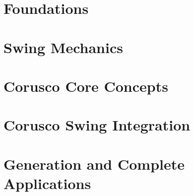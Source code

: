 \documentclass[10pt,a5paper,twoside,openright]{book}
\begin{document}
\frontmatter


\tableofcontents
\mainmatter
\part{Foundations}






\part{Swing Mechanics}














\part{Corusco Core Concepts}







\part{Corusco Swing Integration}






\part{Generation and Complete Applications}





\backmatter


\end{document}

